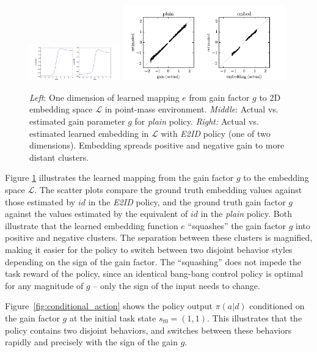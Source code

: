 \documentclass{article}
\newcommand{\cL}{\mathcal{L}}
\newcommand{\plain}{\emph{plain}}
\newcommand{\embed}{\emph{E2ID}}
\newcommand{\embedfn}{e}
\newcommand{\idfn}{id}
\newcommand{\latent}{\cL}
\newcommand{\idvar}{d}
\newcommand{\figref}[1]{Figure \ref{#1}}
\begin{document}
\begin{figure}
\centering
\includegraphics[trim={13.7cm 0 2cm 0}, clip, width=0.35\textwidth]{pointmass_embed_mapping.pdf}
\includegraphics[trim={0.5cm 0 1cm 0}, clip, width=0.63\textwidth]{pointmass_embed_scatter.pdf}
\caption{
\emph{Left}: One dimension of learned mapping $\embedfn$ from gain factor $g$ to 2D embedding space $\latent$ in point-mass environment.
\emph{Middle}: Actual vs. estimated gain parameter $g$ for \plain{} policy.
\emph{Right:} Actual vs. estimated learned embedding in $\latent$ with \embed{} policy (one of two dimensions).
Embedding spreads positive and negative gain to more distant clusters.
}
\label{embed-mapping}
\end{figure}


\figref{embed-mapping} illustrates the learned mapping from the gain factor $g$
to the embedding space $\latent$.
The scatter plots compare the ground truth embedding values
against those estimated by $\idfn$ in the \embed{} policy,
and the ground truth gain factor $g$ against the values estimated by the equivalent of $\idfn$ in the \plain{} policy.
Both illustrate that the learned embedding function $\embedfn$ ``squashes'' the gain factor $g$ into positive and negative clusters.
The separation between these clusters is magnified, making it easier for the policy to switch between two disjoint behavior styles depending on the sign of the gain factor.
The ``squashing'' does not impede the task reward of the policy,
since an identical bang-bang control policy is optimal for any magnitude of $g$ -- only the sign of the input needs to change.

Figure~\ref{fig:conditional_action} shows the policy output $\pi(a|\idvar)$ conditioned on
the gain factor $g$ at the initial task state $s_{t0} = (1, 1)$.
This illustrates that the policy contains two disjoint behaviors,
and switches between these behaviors rapidly and precisely with the sign of the gain $g$.
\end{document}
